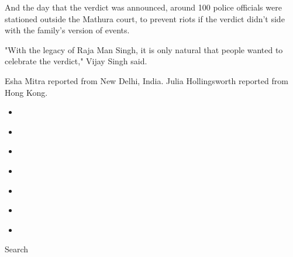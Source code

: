 And the day that the verdict was announced, around 100 police officials
were stationed outside the Mathura court, to prevent riots if the
verdict didn't side with the family's version of events.

"With the legacy of Raja Man Singh, it is only natural that people
wanted to celebrate the verdict," Vijay Singh said.

Esha Mitra reported from New Delhi, India. Julia Hollingsworth reported
from Hong Kong.

\begin{itemize}
\item
\end{itemize}

\begin{itemize}
\item
\end{itemize}

\begin{itemize}
\item
\end{itemize}

\begin{itemize}
\item
\end{itemize}

\begin{itemize}
\item
\end{itemize}

\begin{itemize}
\item
\end{itemize}

\begin{itemize}
\item
\end{itemize}

Search

